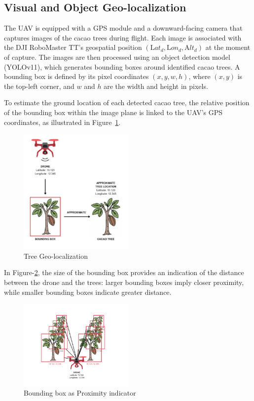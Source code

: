 \subsection{Visual and Object Geo-localization}

The UAV is equipped with a GPS module and a downward-facing camera that captures images of the cacao trees during flight. Each image is associated with the DJI RoboMaster TT’s geospatial position $(\text{L}at_d, \text{L}on_d, \text{A}lt_d)$ at the moment of capture. The images are then processed using an object detection model (YOLOv11), which generates bounding boxes around identified cacao trees. A bounding box is defined by its pixel coordinates $(x, y, w, h)$, where $(x, y)$ is the top-left corner, and $w$ and $h$ are the width and height in pixels.

To estimate the ground location of each detected cacao tree, the relative position of the bounding box within the image plane is linked to the UAV’s GPS coordinates, as illustrated in Figure~\ref{fig:tree}.

\begin{figure}[H]
	\centering
	\caption{Tree Geo-localization}
	\label{fig:tree}
	\includegraphics[width=0.5\textwidth]{figures/tree.png}
\end{figure}

In Figure-\ref{fig:treex}, the size of the bounding box provides an indication of the distance between the drone and the trees: larger bounding boxes imply closer proximity, while smaller bounding boxes indicate greater distance.

\begin{figure}[H]
	\centering
	\caption{Bounding box as Proximity indicator}
	\label{fig:treex}
	\includegraphics[width=0.5\textwidth]{figures/treex.png}
\end{figure}



